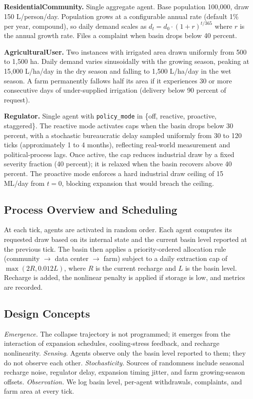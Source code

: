 \documentclass[sigconf,nonacm]{acmart}
\begin{document}
\textbf{ResidentialCommunity.} Single aggregate agent. Base population 100{,}000, draw 150 L/person/day. Population grows at a configurable annual rate (default 1\% per year, compound), so daily demand scales as $d_t = d_0 \cdot (1 + r)^{t/365}$ where $r$ is the annual growth rate. Files a complaint when basin drops below 40 percent.

\textbf{AgriculturalUser.} Two instances with irrigated area drawn uniformly from 500 to 1{,}500 ha. Daily demand varies sinusoidally with the growing season, peaking at 15{,}000 L/ha/day in the dry season and falling to 1{,}500 L/ha/day in the wet season. A farm permanently fallows half its area if it experiences 30 or more consecutive days of under-supplied irrigation (delivery below 90 percent of request).

\textbf{Regulator.} Single agent with \texttt{policy\_mode} in \{off, reactive, proactive, staggered\}. The reactive mode activates caps when the basin drops below 30 percent, with a stochastic bureaucratic delay sampled uniformly from 30 to 120 ticks (approximately 1 to 4 months), reflecting real-world measurement and political-process lags. Once active, the cap reduces industrial draw by a fixed severity fraction (40 percent); it is relaxed when the basin recovers above 40 percent. The proactive mode enforces a hard industrial draw ceiling of 15 ML/day from $t=0$, blocking expansion that would breach the ceiling.

\subsection{Process Overview and Scheduling}
At each tick, agents are activated in random order. Each agent computes its requested draw based on its internal state and the current basin level reported at the previous tick. The basin then applies a priority-ordered allocation rule (community $\rightarrow$ data center $\rightarrow$ farm) subject to a daily extraction cap of $\max(2R, 0.012L)$, where $R$ is the current recharge and $L$ is the basin level. Recharge is added, the nonlinear penalty is applied if storage is low, and metrics are recorded.

\subsection{Design Concepts}
\textit{Emergence.} The collapse trajectory is not programmed; it emerges from the interaction of expansion schedules, cooling-stress feedback, and recharge nonlinearity. \textit{Sensing.} Agents observe only the basin level reported to them; they do not observe each other. \textit{Stochasticity.} Sources of randomness include seasonal recharge noise, regulator delay, expansion timing jitter, and farm growing-season offsets. \textit{Observation.} We log basin level, per-agent withdrawals, complaints, and farm area at every tick.
\end{document}

